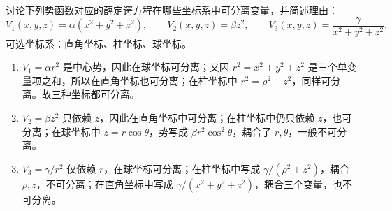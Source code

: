 \begin{question}
讨论下列势函数对应的薛定谔方程在哪些坐标系中可分离变量，并简述理由：
\[
V_1(x,y,z)=\alpha(x^2+y^2+z^2),\qquad V_2(x,y,z)=\beta z^2,
\qquad V_3(x,y,z)=\frac{\gamma}{x^2+y^2+z^2}.
\]
可选坐标系：直角坐标、柱坐标、球坐标。
\begin{solution}

\begin{enumerate}[label=(\arabic*),leftmargin=2.8em,itemsep=0.2em]
\item $V_1=\alpha r^2$ 是中心势，因此在球坐标可分离；又因 $r^2=x^2+y^2+z^2$ 是三个单变量项之和，所以在直角坐标也可分离；在柱坐标中 $r^2=\rho^2+z^2$，同样可分离。故三种坐标都可分离。
\item $V_2=\beta z^2$ 只依赖 $z$，因此在直角坐标中可分离；在柱坐标中仍只依赖 $z$，也可分离；在球坐标中 $z=r\cos\theta$，势写成 $\beta r^2\cos^2\theta$，耦合了 $r,\theta$，一般不可分离。
\item $V_3=\gamma/r^2$ 仅依赖 $r$，在球坐标可分离；在柱坐标中写成 $\gamma/(\rho^2+z^2)$，耦合 $\rho,z$，不可分离；在直角坐标中写成 $\gamma/(x^2+y^2+z^2)$，耦合三个变量，也不可分离。
\end{enumerate}

\end{solution}
\end{question}

